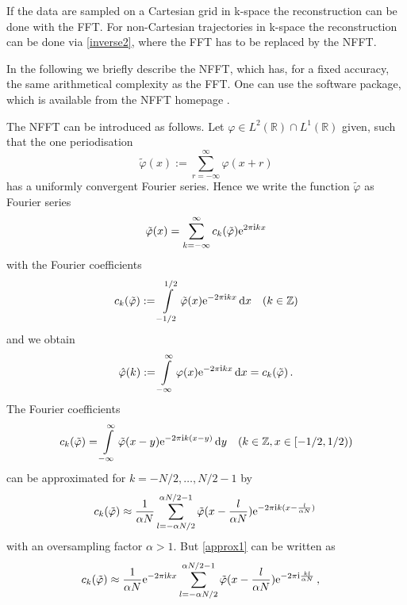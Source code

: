 \documentclass[journal]{IEEEtran}
\def\ti{\mbox{\scriptsize{\rm i}}}
\newcommand{\eip}[1]{{\rm e}^{ 2\pi{\ti} #1}}
\newcommand{\eim}[1]{{\rm e}^{-2\pi{\ti} #1}}
\renewcommand{\d}{{\rm d}}
\numberwithin{equation}{section}
\numberwithin{table}{section}
\numberwithin{figure}{section}
\begin{document}
If the data are sampled on a Cartesian grid in k-space the
reconstruction can be done with the FFT. For non-Cartesian
trajectories in k-space the reconstruction can be done via
\eqref{inverse2}, where the FFT has to be replaced by the NFFT.

In the following we briefly describe the NFFT, which has, for a fixed accuracy,
the same arithmetical complexity as the FFT. One can use the
software package, which is available from the NFFT homepage \cite{kupo02C}.

The NFFT can be introduced as follows. 
Let $\varphi\in L^2(\mathbb{R})\cap L^1(\mathbb{R}) $ given, such that
the one periodisation
\begin{equation} \label{phiper}
\tilde\varphi(x) :=  \sum_{r=-\infty}^{\infty} \varphi(x+r)
\end{equation} 
has a uniformly convergent Fourier series.
Hence we write the function $\tilde\varphi$ as Fourier series 
\begin{equation} \label{FRphi}
\tilde\varphi (x) =  \sum_{ k=-\infty }^{\infty}  c_{k}(\tilde\varphi)  
\eip{ k x} 
\end{equation} 
with the Fourier coefficients 
\begin{equation} \label{FKphi}
c_{ k} (\tilde \varphi ) :=  
\int\limits_{-1/2}^{1/2} \tilde\varphi ( x)
  \eim{ kx} \, {\rm d} {x} \quad ( k \in \mathbb{Z}) 
\end{equation}
and we obtain 
\begin{equation}\label{FK=ck}
\hat\varphi(k) := \int\limits_{-\infty}^{\infty} \varphi ( x)
  \eim{ k x} \, \d { x} = c_{ k} (\tilde \varphi )\, .
\end{equation}
The Fourier coefficients
\begin{equation*}
c_{ k} (\tilde \varphi ) =  
\int\limits_{-\infty}^{\infty} \tilde\varphi (x-y)
  \eim{ k(x-y)} \, {\rm d} {y} \quad ( k \in \mathbb{Z}, x\in[-1/2,1/2)) 
\end{equation*}
can be approximated for $k=-N/2,\ldots, N/2-1$ by
\begin{equation} \label{approx1}
c_{ k} (\tilde \varphi ) \approx
\frac{1}{\alpha N} \sum_{l=-\alpha N/2}^{\alpha N/2-1}
\tilde\varphi (x-\frac{l}{\alpha N})  \eim{ k(x-\frac{l}{\alpha N})} \,
\end{equation}
with an oversampling factor $\alpha >1$.
But \eqref{approx1} can be written as
\[
c_{ k} (\tilde \varphi ) \approx
\frac{1}{\alpha N}\eim{kx}
\sum_{l=-\alpha N/2}^{\alpha N/2-1}
\tilde\varphi (x-\frac{l}{\alpha N})  \eim{\frac{kl}{\alpha N}} \,,\quad
\]
\end{document}
